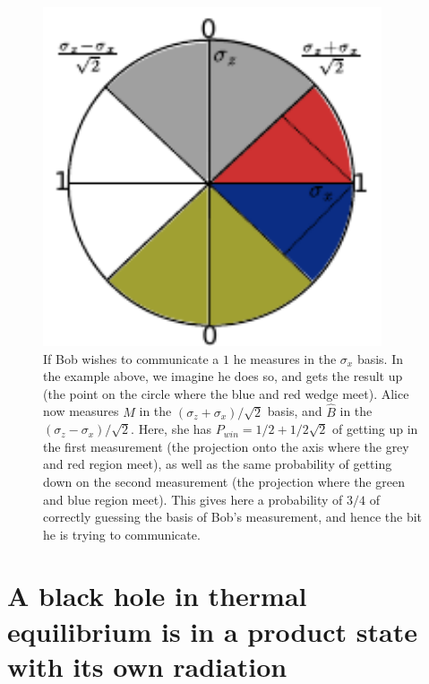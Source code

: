 \documentclass[12pt,a4paper]{article}
\begin{document}
\begin{figure}
\includegraphics[width=10cm]{chsh.pdf}
	\caption{If Bob wishes to communicate a $1$ he measures in the $\sigma_x$ basis. In the example above, we imagine he does so, and gets the result up (the point on the circle where the blue and red wedge meet). Alice now measures $M$ in the $(\sigma_z+\sigma_x)/\sqrt{2}$ basis, and ${\hat B}$ in the $(\sigma_z-\sigma_x)/\sqrt{2}$. Here, she has $P_{win}=1/2+1/2\sqrt{2}$ of getting up in the first measurement (the projection onto the axis where the grey and red region meet), as well as the same probability of getting down on the second measurement (the projection where the green and blue region meet). This gives here a probability of $3/4$ of correctly guessing the basis of Bob's measurement, and hence the bit he is trying to communicate.
	}
\label{fig:chsh}
\end{figure}



%

\appendix

\section{A black hole in thermal equilibrium is in a product state with its own radiation}
\label{sec:product}
\end{document}
